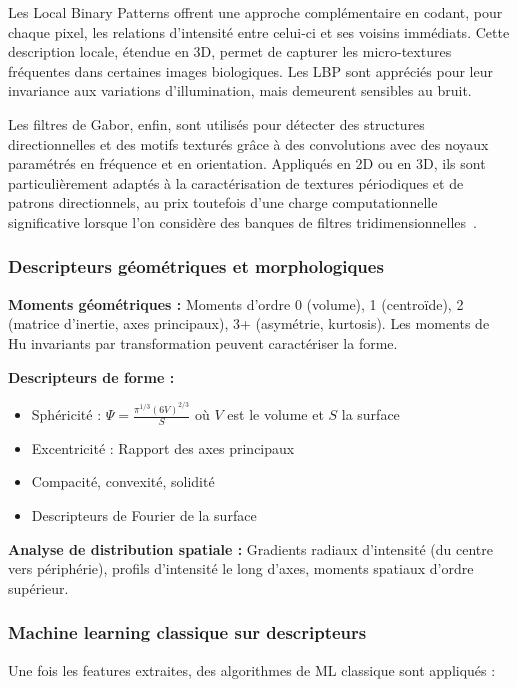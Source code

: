 Les Local Binary Patterns offrent une approche complémentaire en codant, pour chaque pixel, les relations d’intensité entre celui-ci et ses voisins immédiats. Cette description locale, étendue en 3D, permet de capturer les micro-textures fréquentes dans certaines images biologiques. Les LBP sont appréciés pour leur invariance aux variations d’illumination, mais demeurent sensibles au bruit.

Les filtres de Gabor, enfin, sont utilisés pour détecter des structures directionnelles et des motifs texturés grâce à des convolutions avec des noyaux paramétrés en fréquence et en orientation. Appliqués en 2D ou en 3D, ils sont particulièrement adaptés à la caractérisation de textures périodiques et de patrons directionnels, au prix toutefois d’une charge computationnelle significative lorsque l’on considère des banques de filtres tridimensionnelles~\cite{Fogel1989}.

\subsubsection{Descripteurs géométriques et morphologiques}

\textbf{Moments géométriques :}
Moments d'ordre 0 (volume), 1 (centroïde), 2 (matrice d'inertie, axes principaux), 3+ (asymétrie, kurtosis). Les moments de Hu invariants par transformation peuvent caractériser la forme.

\textbf{Descripteurs de forme :}
\begin{itemize}
    \item Sphéricité : $\Psi = \frac{\pi^{1/3}(6V)^{2/3}}{S}$ où $V$ est le volume et $S$ la surface
    \item Excentricité : Rapport des axes principaux
    \item Compacité, convexité, solidité
    \item Descripteurs de Fourier de la surface
\end{itemize}

\textbf{Analyse de distribution spatiale :}
Gradients radiaux d'intensité (du centre vers périphérie), profils d'intensité le long d'axes, moments spatiaux d'ordre supérieur.

\subsubsection{Machine learning classique sur descripteurs}

Une fois les features extraites, des algorithmes de ML classique sont appliqués :

